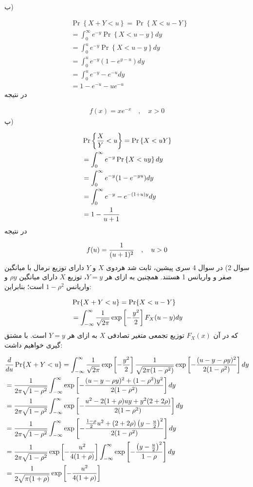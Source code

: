 \documentclass[10pt,letterpaper]{report}
\newcommand{\eqn}[1]{
\[\begin{split}
#1
\end{split}\]
}
\begin{document}
ب)
\eqn{
&\Pr\left\{X+Y<u\right\}=\Pr\left\{X<u-Y\right\}
\\&=\int_0^\infty e^{-y}\Pr\left\{X<u-y\right\}dy
\\&=\int_0^u e^{-y}\Pr\left\{X<u-y\right\}dy
\\&=\int_0^u e^{-y}(1-e^{y-u})dy
\\&=\int_0^u e^{-y}-e^{-u}dy
\\&=1-e^{-u}-ue^{-u}
}{}
در نتیجه
\eqn{
f(x)=xe^{-x}\quad,\quad x>0
}{}
پ)
\eqn{
&\Pr\left\{{X\over Y}<u\right\}=\Pr\left\{X<uY\right\}
\\&=\int_0^\infty e^{-y}\Pr\left\{X<uy\right\}dy
\\&=\int_0^\infty e^{-y}(1-e^{-yu})dy
\\&=\int_0^\infty e^{-y}-e^{-(1+u)y}dy
\\&=1-{1\over u+1}
}{}
در نتیجه
\eqn{
f(u)={1\over (u+1)^2}
\quad,\quad u>0
}{}
\newline
\newline
سوال 2) در سوال 4 سری پیشین، ثابت شد هردوی $X$ و $Y$ دارای توزیع نرمال با میانگین صفر و واریانس 1 هستند. همچنین به ازای هر $Y=y$، توزیع $X$ دارای میانگین $\rho y$ و واریانس $1-\rho^2$ است؛ بنابراین:
\eqn{
&\Pr\{X+Y<u\}=\Pr\{X<u-Y\}
\\&=\int_{-\infty}^{\infty}{1\over \sqrt{2\pi}}\exp\left[-{y^2\over 2}\right]F_X(u-y)dy
}{}
که در آن $F_X(x)$ توزیع تجمعی متغیر تصادفی $X$ به ازای هر $Y=y$ است. با مشتق گیری خواهیم داشت:
\eqn{
&{d\over du}\Pr\{X+Y<u\}
=\int_{-\infty}^{\infty}{1\over \sqrt{2\pi}}\exp\left[-{y^2\over 2}\right]{1\over \sqrt{2\pi(1-\rho^2)}}\exp\left[-{(u-y-\rho y)^2\over 2(1-\rho^2)}\right]dy
\\&={1\over 2\pi\sqrt{1-\rho^2}}
\int_{-\infty}^{\infty}\exp\left[-{(u-y-\rho y)^2+(1-\rho^2)y^2\over 2(1-\rho^2)}\right]dy
\\&={1\over 2\pi\sqrt{1-\rho^2}}
\int_{-\infty}^{\infty}\exp\left[-{u^2-2(1+\rho)uy+y^2(2+2\rho)\over 2(1-\rho^2)}\right]dy
\\&={1\over 2\pi\sqrt{1-\rho^2}}
\int_{-\infty}^{\infty}\exp\left[-{{1-\rho\over 2}u^2+(2+2\rho)\left(y-{u\over 2}\right)^2\over 2(1-\rho^2)}\right]dy
\\&={1\over 2\pi\sqrt{1-\rho^2}}
\exp\left[-{u^2\over 4(1+\rho)}\right]
\int_{-\infty}^{\infty}\exp\left[-{\left(y-{u\over 2}\right)^2\over 1-\rho}\right]dy
\\&={1\over2\sqrt{\pi(1+\rho)}}
\exp\left[-{u^2\over 4(1+\rho)}\right]
}{}
\end{document}
